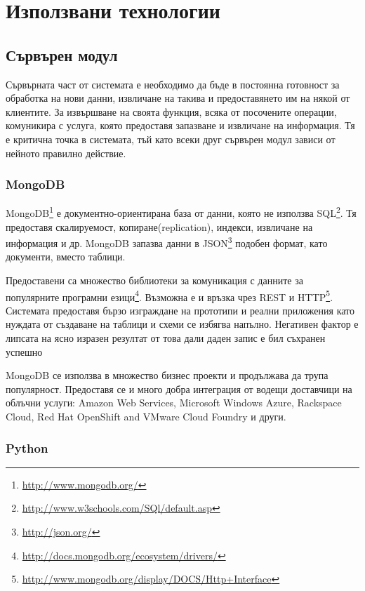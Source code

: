 \section{Използвани технологии}
	\subsection{Сървърен модул}
		
		Сървърната част от системата е необходимо да бъде в постоянна готовност за обработка на нови данни, извличане на такива и предоставянето им
		на някой от клиентите. За извършване на своята функция, всяка от посочените операции, комуникира с услуга, която предоставя запазване и извличане на информация. Тя е критична точка в системата, тъй като всеки друг сървърен модул зависи от нейното правилно действие.
	
		\subsubsection{MongoDB}
		
			MongoDB\footnote{\url{http://www.mongodb.org/}}	е документно-ориентирана база от данни, която не използва SQL\footnote{\url{http://www.w3schools.com/SQl/default.asp}}. Тя предоставя скалируемост, копиране(replication), индекси, извличане на информация и др.
			MongoDB запазва данни в JSON\footnote{\url{http://json.org/}} подобен формат, като документи, вместо таблици.
			
			Предоставени са множество библиотеки за комуникация с данните за популярните програмни езици\footnote{\url{http://docs.mongodb.org/ecosystem/drivers/}}. Възможна е и връзка чрез REST и HTTP\footnote{\url{http://www.mongodb.org/display/DOCS/Http+Interface}}.
			Системата предоставя бързо изграждане на прототипи и реални приложения като нуждата от създаване на таблици и схеми се избягва напълно.
			Негативен фактор е липсата на ясно изразен резултат от това дали даден запис е бил съхранен успешно\cite{Sirer}
			
			MongoDB се използва в множество бизнес проекти и продължава да трупа популярност. Предоставя се и много добра интеграция от водещи доставчици на облъчни услуги: Amazon Web Services, Microsoft Windows Azure, Rackspace Cloud, Red Hat OpenShift and VMware Cloud Foundry и други\cite{Marketwire}.
		
		\subsubsection{Python}
		
